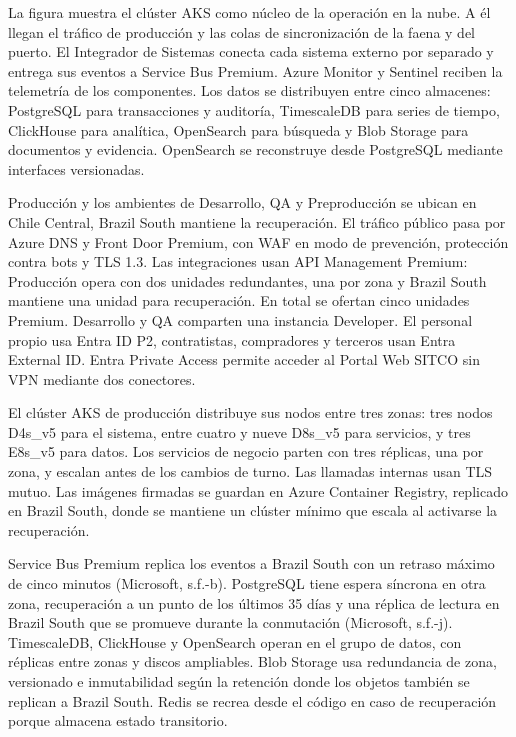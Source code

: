 \documentclass[subdoc]{../../comun/overfore}
\begin{document}
\begin{horizontal}
\end{horizontal}
La figura muestra el clúster AKS como núcleo de la operación en la nube. A él llegan el tráfico de producción y las colas de sincronización de la faena y del puerto. El Integrador de Sistemas conecta cada sistema externo por separado y entrega sus eventos a Service Bus Premium. Azure Monitor y Sentinel reciben la telemetría de los componentes. Los datos se distribuyen entre cinco almacenes: PostgreSQL para transacciones y auditoría, TimescaleDB para series de tiempo, ClickHouse para analítica, OpenSearch para búsqueda y Blob Storage para documentos y evidencia. OpenSearch se reconstruye desde PostgreSQL mediante interfaces versionadas.

Producción y los ambientes de Desarrollo, QA y Preproducción se ubican en Chile Central, Brazil South mantiene la recuperación. El tráfico público pasa por Azure DNS y Front Door Premium, con WAF en modo de prevención, protección contra bots y TLS 1.3. Las integraciones usan API Management Premium: Producción opera con dos unidades redundantes, una por zona y Brazil South mantiene una unidad para recuperación. En total se ofertan cinco unidades Premium. Desarrollo y QA comparten una instancia Developer. El personal propio usa Entra ID P2, contratistas, compradores y terceros usan Entra External ID. Entra Private Access permite acceder al Portal Web SITCO sin VPN mediante dos conectores.

El clúster AKS de producción distribuye sus nodos entre tres zonas: tres nodos D4s\_v5 para el sistema, entre cuatro y nueve D8s\_v5 para servicios, y tres E8s\_v5 para datos. Los servicios de negocio parten con tres réplicas, una por zona, y escalan antes de los cambios de turno. Las llamadas internas usan TLS mutuo. Las imágenes firmadas se guardan en Azure Container Registry, replicado en Brazil South, donde se mantiene un clúster mínimo que escala al activarse la recuperación.

Service Bus Premium replica los eventos a Brazil South con un retraso máximo de cinco minutos (Microsoft, s.f.-b). PostgreSQL tiene espera síncrona en otra zona, recuperación a un punto de los últimos 35 días y una réplica de lectura en Brazil South que se promueve durante la conmutación (Microsoft, s.f.-j). TimescaleDB, ClickHouse y OpenSearch operan en el grupo de datos, con réplicas entre zonas y discos ampliables. Blob Storage usa redundancia de zona, versionado e inmutabilidad según la retención donde los objetos también se replican a Brazil South. Redis se recrea desde el código en caso de recuperación porque almacena estado transitorio.
\end{document}
